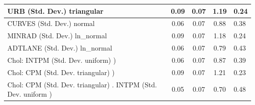 \begin{table}
\begin{center}
\begin{tabular}{|l|l|c|c|c|l|}
			\hline
			URB (Std. Dev.) triangular &  & 0.09 & 0.07 & 1.19 & 0.24 \\
			\hline
			CURVES (Std. Dev.) normal &  & 0.06 & 0.07 & 0.88 & 0.38 \\
			\hline
			MINRAD (Std. Dev.) ln_normal &  & 0.09 & 0.07 & 1.18 & 0.24 \\
			\hline
			ADTLANE (Std. Dev.) ln_normal &  & 0.06 & 0.07 & 0.79 & 0.43 \\
			\hline
			 Chol: INTPM (Std. Dev. uniform) ) &  & 0.06 & 0.07 & 0.87 & 0.39 \\
			\hline
			 Chol: CPM (Std. Dev. triangular) ) &  & 0.09 & 0.07 & 1.21 & 0.23 \\
			\hline
			 Chol: CPM (Std. Dev. triangular) . INTPM (Std. Dev.   uniform ) &  & 0.05 & 0.07 & 0.70 & 0.48 \\
			\hline
		\end{tabular}
	\end{center}
\end{table}